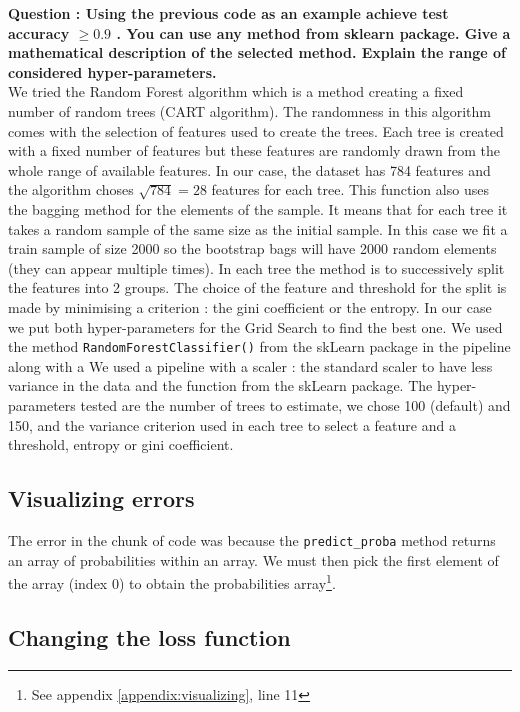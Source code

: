 \textbf{Question : Using the previous code as an example achieve test accuracy  $\geq0.9$ . You can use any method from sklearn package. Give a mathematical description of the selected method. Explain the range of considered hyper-parameters.}\\

We tried the Random Forest algorithm which is a method creating a fixed number of random trees (CART algorithm). The randomness in this algorithm comes with the selection of features used to create the trees. Each tree is created with a fixed number of features but these features are randomly drawn from the whole range of available features. In our case, the dataset has 784 features and the algorithm choses $\sqrt{784} = 28$ features for each tree. This function also uses the bagging method for the elements of the sample. It means that for each tree it takes a random sample of the same size as the initial sample. In this case we fit a train sample of size 2000 so the bootstrap bags will have 2000 random elements (they can appear multiple times). In each tree the method is to successively split the features into 2 groups. The choice of the feature and threshold for the split is made by minimising a criterion : the gini coefficient or the entropy. In our case we put both hyper-parameters for the Grid Search to find the best one. 
We used the method \verb|RandomForestClassifier()| from the skLearn package in the pipeline along with a \verb||
 We used a pipeline with a scaler : the standard scaler to have less variance in the data and the function from the skLearn package. The hyper-parameters tested are the number of trees to estimate, we chose 100 (default) and 150,  and the variance criterion used in each tree to select a feature and a threshold, entropy or gini coefficient.


\subsection{Visualizing errors}
The error in the chunk of code was because the \verb|predict_proba| method returns an array of probabilities within an array. We must then pick the first element of the array (index 0) to obtain the probabilities array\footnote{See appendix \ref{appendix:visualizing}, line 11}.\\

\subsection{Changing the loss function}
 

